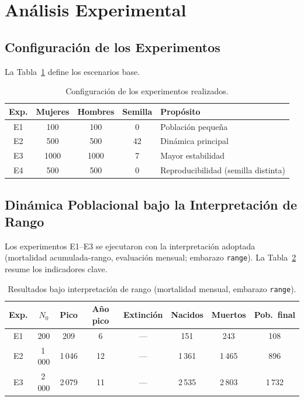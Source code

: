 \documentclass{llncs}
\begin{document}
\section{Análisis Experimental}
\label{sec:experimentos}

\subsection{Configuración de los Experimentos}

La Tabla~\ref{tab:experimentos} define los escenarios base.

\begin{table}[H]
\caption{Configuración de los experimentos realizados.}
\label{tab:experimentos}
\centering
\begin{tabular}{ccccl}
\toprule
\textbf{Exp.} & \textbf{Mujeres} & \textbf{Hombres} & \textbf{Semilla} &
\textbf{Propósito} \\
\midrule
E1 & 100  & 100  & 0  & Población pequeña \\
E2 & 500  & 500  & 42 & Dinámica principal \\
E3 & 1000 & 1000 & 7  & Mayor estabilidad \\
E4 & 500  & 500  & 0  & Reproducibilidad (semilla distinta) \\
\bottomrule
\end{tabular}
\end{table}

\subsection{Dinámica Poblacional bajo la Interpretación de Rango}

Los experimentos E1--E3 se ejecutaron con la interpretación adoptada
(mortalidad acumulada-rango, evaluación mensual; embarazo \texttt{range}).
La Tabla~\ref{tab:resultados} resume los indicadores clave.

\begin{table}[H]
\caption{Resultados bajo interpretación de rango (mortalidad mensual,
         embarazo \texttt{range}).}
\label{tab:resultados}
\centering
\begin{tabular}{cccccccc}
\toprule
\textbf{Exp.} & \textbf{$N_0$} & \textbf{Pico} & \textbf{Año pico} &
\textbf{Extinción} & \textbf{Nacidos} & \textbf{Muertos} &
\textbf{Pob.\ final} \\
\midrule
E1 &    200 &    209 &  6 & --- &    151 &    243 &    108 \\
E2 & 1\,000 & 1\,046 & 12 & --- & 1\,361 & 1\,465 &    896 \\
E3 & 2\,000 & 2\,079 & 11 & --- & 2\,535 & 2\,803 & 1\,732 \\
\bottomrule
\end{tabular}
\end{table}
\end{document}

